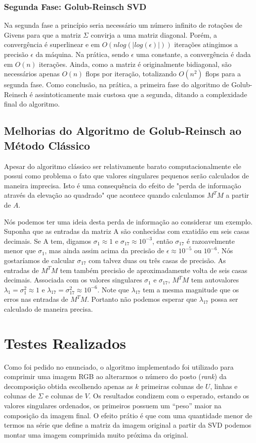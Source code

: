 \documentclass[brazil,times]{abnt}
\begin{document}
		\subsection{Segunda Fase: Golub-Reinsch SVD}
			Na segunda fase a princípio seria necessário um número infinito de rotações de Givens para que a matriz $\Sigma$ convirja a uma matriz diagonal. Porém, a convergência é superlinear e em $O(n log(|log(\epsilon)|))$ iterações atingimos a precisão $\epsilon$ da máquina. Na prática, sendo $\epsilon$ uma constante, a convergência é dada em $O(n)$ iterações. Ainda, como a matriz é originalmente bidiagonal, são necessários apenas $O(n)$ flops por iteração, totalizando $O(n^2)$ flops para a segunda fase. Como conclusão, na prática, a primeira fase do algoritmo de Golub-Reinsch é assintoticamente mais custosa que a segunda, ditando a complexidade final do algoritmo. \cite{trefethen}
			

	\section{Melhorias do Algoritmo de Golub-Reinsch ao Método Clássico\label{melhorias}}
		Apesar do algoritmo clássico ser relativamente barato computacionalmente ele possui como problema o fato que valores singulares pequenos serão calculados de maneira imprecisa. Isto é uma consequência do efeito de "perda de informação através da elevação ao quadrado" que acontece quando calculamos $M^{T}M$ a partir de $A$.
		
		Nós podemos ter uma ideia desta perda de informação ao considerar um exemplo. Suponha que as entradas da matriz A são conhecidas com exatidão em seis casas decimais. Se A tem, digamos $\sigma_1 \approx 1$ e $\sigma_{17} \approx 10^{-3}$, então $\sigma_{17}$ é razoavelmente menor que $\sigma_1$, mas ainda assim acima da precisão de $\epsilon \approx 10^{-5}$ ou $10^{-6}$. Nós gostaríamos de calcular $\sigma_{17}$ com talvez duas ou três casas de precisão. As entradas de $M^{T}M$ tem também precisão de aproximadamente volta de seis casas decimais. Associada com os valores singulares $\sigma_1$ e $\sigma_{17}$, $M^{T}M$ tem autovalores $\lambda_1 = \sigma_{1}^{2} \approx 1$ e $\lambda_{17} = \sigma_{17}^{2} \approx 10^{-6}$. Note que $\lambda_{17}$ tem a mesma magnitude que os erros nas entradas de $M^{T}M$. Portanto não podemos esperar que $\lambda_{17}$ possa ser calculado de maneira precisa. \cite{watkins2004fundamentals}
	
	
\chapter{Testes Realizados}
	Como foi pedido no enunciado, o algoritmo implementado foi utilizado para comprimir uma imagem RGB ao alterarmos o número do posto (\emph{rank}) da decomposição obtida escolhendo apenas as $k$ primeiras colunas de $U$, linhas e colunas de $\Sigma$ e colunas de $V$. Os resultados condizem com o esperado, estando os valores singulares ordenados, os primeiros possuem um ``peso'' maior na composição da imagem final. O efeito prátio é que com uma quantidade menor de termos na série que define a matriz da imagem original a partir da SVD podemos montar uma imagem comprimida muito próxima da original.
	
\end{document}
